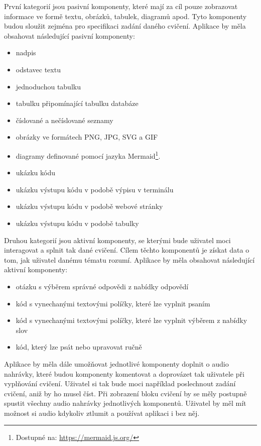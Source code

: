 První kategorií jsou pasivní komponenty, které mají za cíl pouze zobrazovat informace ve formě textu, obrázků, tabulek, diagramů apod. Tyto komponenty budou sloužit zejména pro specifikaci zadání daného cvičení. Aplikace by měla obsahovat následující pasivní komponenty:

\begin{itemize}
    \item nadpis
    \item odstavec textu
    \item jednoduchou tabulku
    \item tabulku připomínající tabulku databáze
    \item číslované a nečíslované seznamy
    \item obrázky ve formátech PNG, JPG, SVG a GIF
    \item diagramy definované pomocí jazyka Mermaid\footnote{Dostupné na: \href{https://mermaid.js.org/}{https://mermaid.js.org/}}.
    \item ukázku kódu
    \item ukázku výstupu kódu v podobě výpisu v terminálu
    \item ukázku výstupu kódu v podobě webové stránky
    \item ukázku výstupu kódu v podobě tabulky
\end{itemize}

Druhou kategorií jsou aktivní komponenty, se kterými bude uživatel moci interagovat a splnit tak dané cvičení. Cílem těchto komponentů je získat data o tom, jak uživatel danému tématu rozumí. Aplikace by měla obsahovat následující aktivní komponenty:

\begin{itemize}
    \item otázku s výběrem správné odpovědi z nabídky odpovědí
    \item kód s vynechanými textovými políčky, které lze vyplnit psaním
    \item kód s vynechanými textovými políčky, které lze vyplnit výběrem z nabídky slov
    \item kód, který lze psát nebo upravovat ručně
\end{itemize}

Aplikace by měla dále umožňovat jednotlivé komponenty doplnit o audio nahrávky, které budou komponenty komentovat a doprovázet tak uživatele při vyplňování cvičení. Uživatel si tak bude moci například poslechnout zadání cvičení, aniž by ho musel číst. Při zobrazení bloku cvičení by se měly postupně spustit všechny audio nahrávky jednotlivých komponentů. Uživatel by měl mít možnost si audio kdykoliv ztlumit a používat aplikaci i bez něj.

